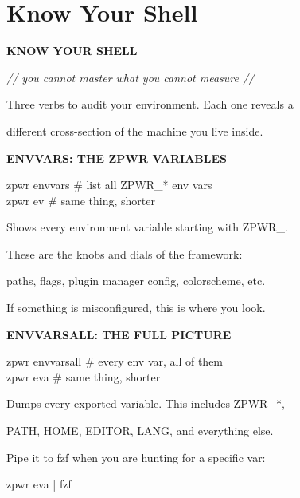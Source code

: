 \documentclass[11pt,a4paper,twoside]{book}
\begin{document}
\section{Know Your Shell}


\vspace{10pt}
{\large\bfseries\color{neoncyan} KNOW YOUR SHELL}\vspace{6pt}

{\small\itshape\color{dimtext} // you cannot master what you cannot measure //}

Three verbs to audit your environment. Each one reveals a

different cross-section of the machine you live inside.


\vspace{12pt}
{\bfseries\color{neonyellow} ENVVARS: THE ZPWR VARIABLES}\vspace{4pt}

\begin{codebox}
zpwr envvars                        \# list all ZPWR\_* env vars\\
zpwr ev                              \# same thing, shorter\\
\end{codebox}

Shows every environment variable starting with ZPWR\_.

These are the knobs and dials of the framework:

paths, flags, plugin manager config, colorscheme, etc.

If something is misconfigured, this is where you look.


\vspace{12pt}
{\bfseries\color{neonyellow} ENVVARSALL: THE FULL PICTURE}\vspace{4pt}

\begin{codebox}
zpwr envvarsall                     \# every env var, all of them\\
zpwr eva                             \# same thing, shorter\\
\end{codebox}

Dumps every exported variable. This includes ZPWR\_*,

PATH, HOME, EDITOR, LANG, and everything else.

Pipe it to fzf when you are hunting for a specific var:

\begin{codebox}
zpwr eva | fzf\\
\end{codebox}
\end{document}
